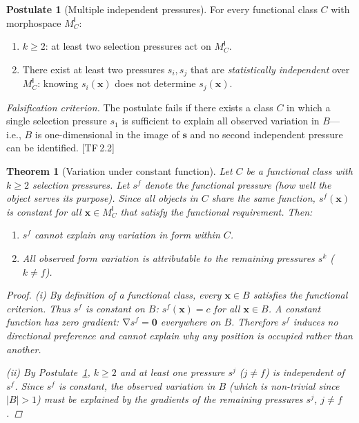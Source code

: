 \documentclass[10pt]{article}
\theoremstyle{definition}
\newtheorem{postulate}[definition]{Postulate}
\theoremstyle{plain}
\newtheorem{theorem}[definition]{Theorem}
\theoremstyle{remark}
\newcommand{\MC}{M^{\mathsf{I}}_C}          %
\newcommand{\abs}[1]{\lvert #1 \rvert}
\DeclareMathOperator{\grad}{\nabla}
\newcommand{\TF}[1]{\textnormal{[TF\,#1]}}  %
\begin{document}
\begin{postulate}[Multiple independent pressures]\label{post:2.3}
For every functional class $C$ with morphospace $\MC$:
\begin{enumerate}[label=(\alph*),nosep]
  \item $k \geq 2$: at least two selection pressures act on $\MC$.
  \item There exist at least two pressures $s_i, s_j$ that are
    \emph{statistically independent} over $\MC$: knowing $s_i(\bm{x})$
    does not determine $s_j(\bm{x})$.
\end{enumerate}

\medskip\noindent
\textit{Falsification criterion.}
The postulate fails if there exists a class $C$ in which a single
selection pressure $s_1$ is sufficient to explain all observed variation
in $B$---i.e., $B$ is one-dimensional in the image of $\bm{s}$ and no
second independent pressure can be identified. \TF{2.2}
\end{postulate}

\begin{theorem}[Variation under constant function]\label{thm:2.4}
Let $C$ be a functional class with $k \geq 2$ selection pressures.
Let $s^f$ denote the functional pressure (how well the object serves its
purpose). Since all objects in $C$ share the same function,
$s^f(\bm{x})$ is constant for all $\bm{x} \in \MC$ that satisfy the
functional requirement. Then:
\begin{enumerate}[label=(\roman*),nosep]
  \item $s^f$ cannot explain any variation in form within $C$.
  \item All observed form variation is attributable to the remaining
    pressures $s^k$ ($k \neq f$).
\end{enumerate}

\begin{proof}
\textit{(i)}\; By definition of a functional class, every $\bm{x} \in B$
satisfies the functional criterion. Thus $s^f$ is constant on $B$:
$s^f(\bm{x}) = c$ for all $\bm{x} \in B$. A constant function has
zero gradient: $\grad s^f = \bm{0}$ everywhere on $B$. Therefore $s^f$
induces no directional preference and cannot explain why any position is
occupied rather than another.

\textit{(ii)}\; By Postulate~\ref{post:2.3}, $k \geq 2$ and at least one
pressure $s^j$ ($j \neq f$) is independent of $s^f$. Since $s^f$ is
constant, the observed variation in $B$ (which is non-trivial since
$\abs{B} > 1$) must be explained by the gradients of the remaining
pressures $s^j$, $j \neq f$. \qedhere
\end{proof}
\end{theorem}
\end{document}
